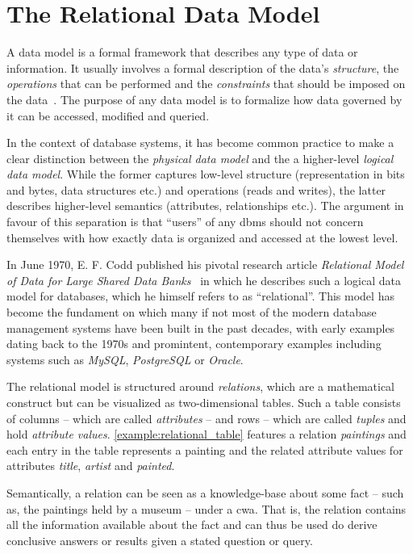 \section{The Relational Data Model}
\label{section:relational_data_model}

A data model is a formal framework that describes any type of data or information. It usually involves a formal description of the data's \emph{structure}, the \emph{operations} that can be performed and the \emph{constraints} that should be imposed on the data~\cite{Garcia:2009Database}. The purpose of any data model is to formalize how data governed by it can be accessed, modified and queried.

In the context of database systems, it has become common practice to make a clear distinction between the \emph{physical data model} and the a higher-level \emph{logical data model}. While the former captures low-level structure (representation in bits and bytes, data structures etc.) and operations (reads and writes), the latter describes higher-level semantics (attributes, relationships etc.). The argument in favour of this separation is that ``users'' of any \gls{dbms} should not concern themselves with how exactly data is organized and accessed at the lowest level.

In June 1970, E. F. Codd published his pivotal research article \emph{Relational Model of Data for Large Shared Data Banks}~\cite{Codd:1970Relational} in which he describes such a logical data model for databases, which he himself refers to as ``relational''. This model has become the fundament on which many if not most of the modern database management systems have been built in the past decades, with early examples dating back to the 1970s \cite{Astrahan:1976Systemr} and promintent, contemporary examples including systems such as \emph{MySQL}, \emph{PostgreSQL} or \emph{Oracle}. 

The relational model is structured around \emph{relations}, which are a mathematical construct but can be visualized as two-dimensional tables. Such a table consists of columns -- which are called \emph{attributes} -- and rows -- which are called \emph{tuples} and hold \emph{attribute values}. \cref{example:relational_table} features a relation \emph{paintings} and each entry in the table represents a painting and the related attribute values for attributes \emph{title}, \emph{artist} and \emph{painted}.

Semantically, a relation can be seen as a knowledge-base about some fact -- such as, the paintings held by a museum -- under a \gls{cwa}{}. That is, the relation contains all the information available about the fact and can thus be used do derive conclusive answers or results given a stated question or query.

